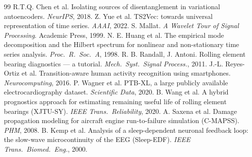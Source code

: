 \documentclass[10pt,twocolumn]{article}
\begin{document}
{\begin{thebibliography}{99}
 R.T.Q. Chen et al. Isolating sources of
disentanglement in variational autoencoders. \emph{NeurIPS}, 2018.
 Z. Yue et al. TS2Vec: towards universal representation
of time series. \emph{AAAI}, 2022.
 S. Mallat. \emph{A Wavelet Tour of Signal
Processing}. Academic Press, 1999.
 N. E. Huang et al. The empirical mode
decomposition and the Hilbert spectrum for nonlinear and non-stationary time
series analysis. \emph{Proc.\ R.\ Soc.\ A}, 1998.
 R. B. Randall, J. Antoni. Rolling element bearing
diagnostics --- a tutorial. \emph{Mech.\ Syst.\ Signal Process.}, 2011.
 J.-L. Reyes-Ortiz et al. Transition-aware human
activity recognition using smartphones. \emph{Neurocomputing}, 2016.
 P. Wagner et al. PTB-XL, a large publicly available
electrocardiography dataset. \emph{Scientific Data}, 2020.
 B. Wang et al. A hybrid prognostics approach for
estimating remaining useful life of rolling element bearings (XJTU-SY).
\emph{IEEE Trans.\ Reliability}, 2020.
 A. Saxena et al. Damage propagation modeling for
aircraft engine run-to-failure simulation (C-MAPSS). \emph{PHM}, 2008.
 B. Kemp et al. Analysis of a sleep-dependent
neuronal feedback loop: the slow-wave microcontinuity of the EEG (Sleep-EDF).
\emph{IEEE Trans.\ Biomed.\ Eng.}, 2000.
\end{thebibliography}
}
\end{document}

